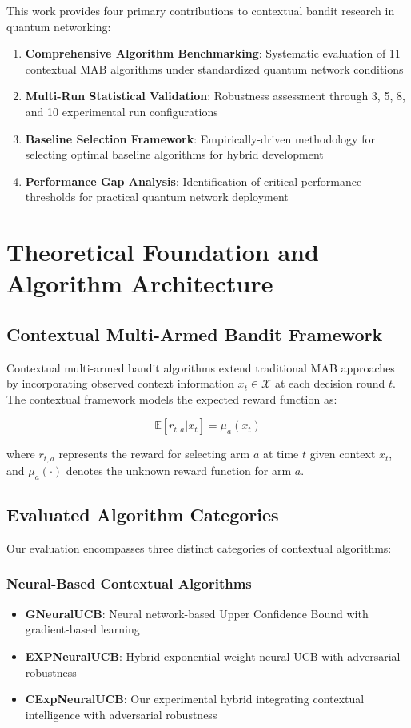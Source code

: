 \documentclass[12pt,a4paper]{article}
\begin{document}
This work provides four primary contributions to contextual bandit research in quantum networking:

\begin{enumerate}
\item \textbf{Comprehensive Algorithm Benchmarking}: Systematic evaluation of 11 contextual MAB algorithms under standardized quantum network conditions
\item \textbf{Multi-Run Statistical Validation}: Robustness assessment through 3, 5, 8, and 10 experimental run configurations
\item \textbf{Baseline Selection Framework}: Empirically-driven methodology for selecting optimal baseline algorithms for hybrid development
\item \textbf{Performance Gap Analysis}: Identification of critical performance thresholds for practical quantum network deployment
\end{enumerate}


\newpage
\section{Theoretical Foundation and Algorithm Architecture}

\subsection{Contextual Multi-Armed Bandit Framework}

Contextual multi-armed bandit algorithms extend traditional MAB approaches by incorporating observed context information $x_t \in \mathcal{X}$ at each decision round $t$. The contextual framework models the expected reward function as:

\begin{equation}
\mathbb{E}[r_{t,a} | x_t] = \mu_a(x_t)
\end{equation}

where $r_{t,a}$ represents the reward for selecting arm $a$ at time $t$ given context $x_t$, and $\mu_a(\cdot)$ denotes the unknown reward function for arm $a$.

\subsection{Evaluated Algorithm Categories}

Our evaluation encompasses three distinct categories of contextual algorithms:

\subsubsection{Neural-Based Contextual Algorithms}
\begin{itemize}
\item \textbf{GNeuralUCB}: Neural network-based Upper Confidence Bound with gradient-based learning
\item \textbf{EXPNeuralUCB}: Hybrid exponential-weight neural UCB with adversarial robustness
\item \textbf{CExpNeuralUCB}: Our experimental hybrid integrating contextual intelligence with adversarial robustness
\end{itemize}
\end{document}
